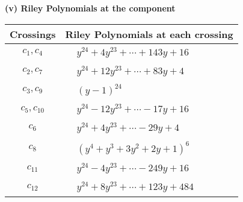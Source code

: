 \documentclass[1p]{elsarticle_modified}
\theoremstyle{definition}
\begin{document}
\newpage\renewcommand{\arraystretch}{1}
\flushleft \textbf{(v) Riley Polynomials at the component}\newline \\
\begin{tabular}{m{50pt}|m{274pt}}
Crossings & \hspace{64pt}Riley Polynomials at each crossing \\
\hline $$\begin{aligned}c_{1},c_{4}\end{aligned}$$&$\begin{aligned}
&y^{24}+4 y^{23}+\cdots+143 y+16
\end{aligned}$\\
\hline $$\begin{aligned}c_{2},c_{7}\end{aligned}$$&$\begin{aligned}
&y^{24}+12 y^{23}+\cdots+83 y+4
\end{aligned}$\\
\hline $$\begin{aligned}c_{3},c_{9}\end{aligned}$$&$\begin{aligned}
&(y-1)^{24}
\end{aligned}$\\
\hline $$\begin{aligned}c_{5},c_{10}\end{aligned}$$&$\begin{aligned}
&y^{24}-12 y^{23}+\cdots-17 y+16
\end{aligned}$\\
\hline $$\begin{aligned}c_{6}\end{aligned}$$&$\begin{aligned}
&y^{24}+4 y^{23}+\cdots-29 y+4
\end{aligned}$\\
\hline $$\begin{aligned}c_{8}\end{aligned}$$&$\begin{aligned}
&(y^4+y^3+3 y^2+2 y+1)^6
\end{aligned}$\\
\hline $$\begin{aligned}c_{11}\end{aligned}$$&$\begin{aligned}
&y^{24}-4 y^{23}+\cdots-249 y+16
\end{aligned}$\\
\hline $$\begin{aligned}c_{12}\end{aligned}$$&$\begin{aligned}
&y^{24}+8 y^{23}+\cdots+123 y+484
\end{aligned}$\\
\hline
\end{tabular}\\~\\
\end{document}
